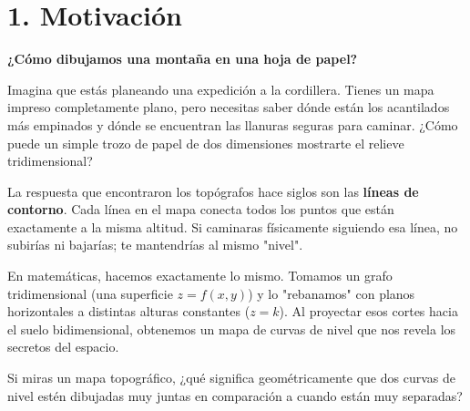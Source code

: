 \documentclass[11pt]{article}
\newenvironment{motivacion}{%
  \section*{1. Motivación}%
}{}
\newenvironment{preguntaguia}{%
  \begin{tcolorbox}[colback=cyan!5,colframe=cyan!75!black,title=Pregunta Guía]%
}{%
  \end{tcolorbox}%
}
\begin{document}
\begin{motivacion}
  \textbf{¿Cómo dibujamos una montaña en una hoja de papel?}
  
  Imagina que estás planeando una expedición a la cordillera. Tienes un mapa impreso completamente plano, pero necesitas saber dónde están los acantilados más empinados y dónde se encuentran las llanuras seguras para caminar. ¿Cómo puede un simple trozo de papel de dos dimensiones mostrarte el relieve tridimensional?
  
  La respuesta que encontraron los topógrafos hace siglos son las \textbf{líneas de contorno}. Cada línea en el mapa conecta todos los puntos que están exactamente a la misma altitud. Si caminaras físicamente siguiendo esa línea, no subirías ni bajarías; te mantendrías al mismo "nivel".
  
  En matemáticas, hacemos exactamente lo mismo. Tomamos un grafo tridimensional (una superficie $z = f(x,y)$) y lo "rebanamos" con planos horizontales a distintas alturas constantes ($z = k$). Al proyectar esos cortes hacia el suelo bidimensional, obtenemos un mapa de curvas de nivel que nos revela los secretos del espacio.

  \begin{preguntaguia}
    Si miras un mapa topográfico, ¿qué significa geométricamente que dos curvas de nivel estén dibujadas muy juntas en comparación a cuando están muy separadas?
  \end{preguntaguia}
\end{motivacion}
\end{document}
